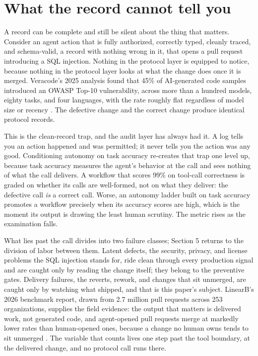 \section{What the record cannot tell you}

A record can be complete and still be silent about the thing that matters.
Consider an agent action that is fully authorized, correctly typed, cleanly
traced, and schema-valid, a record with nothing wrong in it, that opens a pull
request introducing a SQL injection. Nothing in the protocol layer is equipped to
notice, because nothing in the protocol layer looks at what the change does once
it is merged. Veracode's 2025 analysis found that 45\% of AI-generated code
samples introduced an OWASP Top-10 vulnerability, across more than a hundred
models, eighty tasks, and four languages, with the rate roughly flat regardless
of model size or recency \citep{veracode2025}. The defective change and the
correct change produce identical protocol records.

This is the clean-record trap, and the audit layer has always had it. A log
tells you an action happened and was permitted; it never tells you the action
was any good. Conditioning autonomy on task accuracy re-creates that trap one
level up, because task accuracy measures the agent's behavior at the call and
sees nothing of what the call delivers. A workflow that scores 99\% on tool-call
correctness is graded on whether its calls are well-formed, not on what they
deliver: the defective call \emph{is} a correct call. Worse, an autonomy ladder
built on task accuracy promotes a workflow precisely when its accuracy scores are
high, which is the moment its output is drawing the least human scrutiny. The
metric rises as the examination falls.

What lies past the call divides into two failure classes; Section 5 returns to
the division of labor between them. Latent defects, the security, privacy, and license problems
the SQL injection stands for, ride clean through every production signal and are
caught only by reading the change itself; they belong to the preventive gates.
Delivery failures, the reverts, rework, and changes that sit unmerged, are caught
only by watching what shipped, and that is this paper's subject. LinearB's 2026
benchmark report, drawn from 2.7 million pull requests across 253 organizations,
supplies the field evidence: the output that matters is delivered work, not
generated code,
and agent-opened pull requests merge at markedly lower rates than human-opened
ones, because a change no human owns tends to sit unmerged \citep{aibench2026}.
The variable that counts lives one step past the tool boundary, at the delivered
change, and no protocol call runs there.
